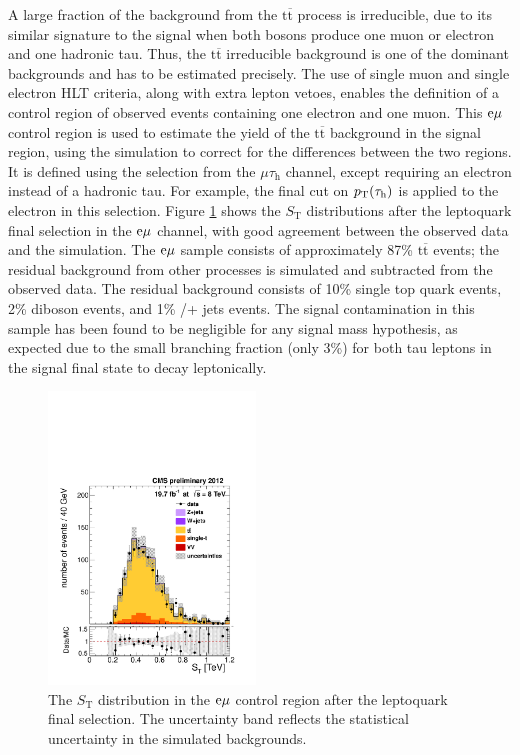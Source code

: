 \documentclass[12pt]{thesis}  %
\newcommand{\tauh}{\ensuremath{\tau_{\text{h}}}\xspace}
\newcommand{\Pe}{\ensuremath{\cmsSymbolFace{e}}\xspace}
\newcommand{\mutau}{\ensuremath{\mu\tauh}\xspace}
\newcommand{\emu}{\ensuremath{\Pe\mu}\xspace}
\renewcommand{\ttbar}{\ensuremath{\mathrm{t}\overline{\mathrm{t}}}\xspace}
\def\ST{\ensuremath{S_{\text{T}}}\xspace}
\begin{document}
A large fraction of the background from the \ttbar process is irreducible, due to its similar signature to the signal when both \W bosons produce one muon or electron and one hadronic tau. Thus, the \ttbar irreducible background is one of the dominant backgrounds and has to be estimated precisely. The use of single muon and single electron HLT criteria, along with extra lepton vetoes, enables the definition of a control region of observed events containing one electron and one muon. This \emu control region is used to estimate the yield of the \ttbar background in the signal region, using the simulation to correct for the differences between the two regions. It is defined using the selection from the \mutau channel, except requiring an electron instead of a hadronic tau. For example, the final cut on $\pt(\tauh)$ is applied to the electron in this selection. Figure \ref{fig:ttCC} shows the \ST distributions after the leptoquark final selection in the $\emu$ channel, with good agreement between the observed data and the simulation. The \emu sample consists of approximately 87\% \ttbar events; the residual background from other processes is simulated and subtracted from the observed data. The residual background consists of 10\% single top quark events, 2\% diboson events, and 1\% \W/\Z + jets events. The signal contamination in this sample has been found to be negligible for any signal mass hypothesis, as expected due to the small branching fraction (only 3\%) for both tau leptons in the signal final state to decay leptonically.

\begin{figure}[hbt]
  \begin{center}
    \includegraphics[width=0.49\textwidth]{figures/bkgEstim/STbjetFinalEMu.pdf}
    \caption{The \ST distribution in the $\emu$ control region after the leptoquark final selection. The uncertainty band reflects the statistical uncertainty in the simulated backgrounds.}
    \label{fig:ttCC}
  \end{center}
\end{figure}
\end{document}
